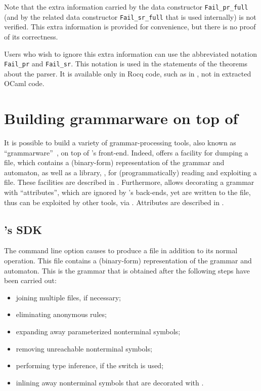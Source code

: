 \documentclass[onecolumn,11pt,nocopyrightspace,preprint]{sigplanconf}
\begin{document}
Note that the extra information carried by the data constructor
\verb+Fail_pr_full+ (and by the related data constructor \verb+Fail_sr_full+
that is used internally) is not verified. This extra information is provided
for convenience, but there is no proof of its correctness.

Users who wish to ignore this extra information can use the abbreviated
notation \verb+Fail_pr+ and \verb+Fail_sr+. This notation is used in the
statements of the theorems about the parser. It is available only in Rocq code,
such as in , not in extracted OCaml code.


\section{Building grammarware on top of \menhir}
\label{sec:grammarware}

It is possible to build a variety of grammar-processing tools,
also known as ``grammarware''~\cite{klint-laemmel-verhoef-05},
on top of \menhir's front-end. Indeed, \menhir offers a facility
for dumping a \cmly file, which contains a (binary-form) representation
of the grammar and automaton,
as well as a library, \menhirsdk,
for (programmatically) reading and exploiting a \cmly file.
These facilities are described in .
%
Furthermore, \menhir allows decorating a grammar with ``attributes'',
which are ignored by \menhir's back-ends,
yet are written to the \cmly file,
thus can be exploited by other tools, via \menhirsdk.
%
Attributes are described in .

\subsection{\menhir's SDK}
\label{sec:sdk}

The command line option \ocmly causes \menhir to produce a \cmly file in
addition to its normal operation. This file contains a (binary-form)
representation of the grammar and automaton. This is the grammar that
is obtained after the following steps have been carried out:
\begin{itemize}
\item joining multiple \mly files, if necessary; %
\item eliminating anonymous rules;
\item expanding away parameterized nonterminal symbols;
\item removing unreachable nonterminal symbols;
\item performing \ocaml type inference, if the \oinfer switch is used;
\item inlining away nonterminal symbols that are decorated with \dinline.
\end{itemize}
\end{document}
